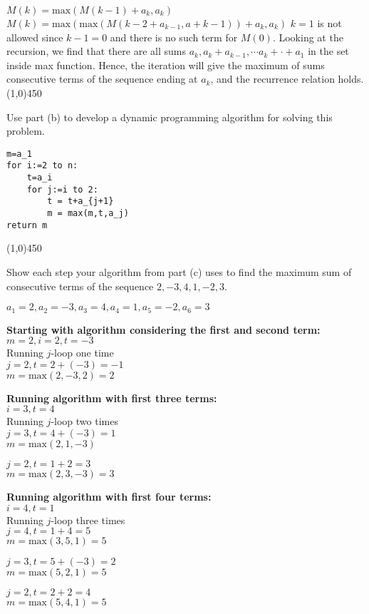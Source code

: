 \documentclass[12pt]{article}  %
\begin{document}
\noindent
$M(k)=\textrm{max}(M(k-1)+a_k,a_k)$\\
$M(k)=\textrm{max}(\textrm{max}(M(k-2+a_{k-1},a+{k-1}))+a_k,a_k)$
$k=1$ is not allowed since $k-1=0$ and there is no such term for $M(0)$.
Looking at the recursion, we find that there are all sums $a_k,a_k+a_{k-1},\cdots a_k+\cdot+a_1$ in the set inside max function. Hence, the iteration will give the maximum of sums consecutive terms of the sequence ending at $a_k$, and the recurrence relation holds.\\
\line(1,0){450}

\noindent
Use part (b) to develop a dynamic programming algorithm for solving this problem.
\begin{verbatim}
m=a_1
for i:=2 to n:
    t=a_i
    for j:=i to 2:
        t = t+a_{j+1}
        m = max(m,t,a_j)
return m
\end{verbatim}
\line(1,0){450}

\noindent
Show each step your algorithm from part (c) uses to find the maximum sum of consecutive terms of the sequence $2,-3,4,1,-2,3$.

\noindent
$a_1=2,a_2=-3,a_3=4,a_4=1,a_5=-2,a_6=3$

\noindent
\textbf{Starting with algorithm considering the first and second term:}\\
$m=2,i=2,t=-3$\\
Running $j$-loop one time\\
$j=2,t=2+(-3)=-1$\\
$m=\textrm{max}(2,-3,2)=2$

\noindent
\textbf{Running algorithm with first three terms:}\\
$i=3,t=4$\\
Running $j$-loop two times\\
$j=3,t=4+(-3)=1$\\
$m=\textrm{max}(2,1,-3)$

\noindent
$j=2,t=1+2=3$\\
$m=\textrm{max}(2,3,-3)=3$

\noindent
\textbf{Running algorithm with first four terms:}\\
$i=4,t=1$\\
Running $j$-loop three times\\
$j=4,t=1+4=5$\\
$m=\textrm{max}(3,5,1)=5$

\noindent
$j=3,t=5+(-3)=2$\\
$m=\textrm{max}(5,2,1)=5$

\noindent
$j=2,t=2+2=4$\\
$m=\textrm{max}(5,4,1)=5$
\end{document}

